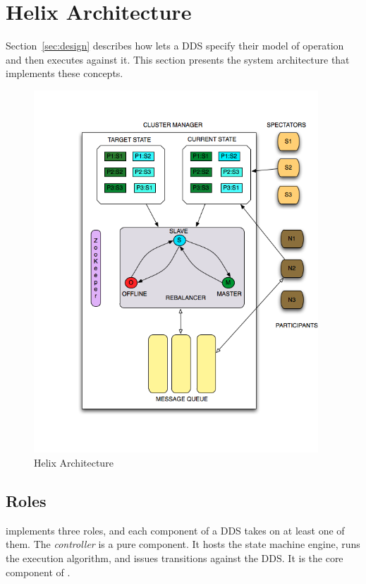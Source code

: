 \section{Helix Architecture}
\label{sec:arch}
%

Section~\ref{sec:design} describes how \helix lets a DDS specify their model of
operation and then executes against it.  This section presents the \helix system
architecture that implements these concepts.

\begin{figure}
\begin{minipage}[t]{0.48\textwidth}
\includegraphics[width=0.95\textwidth]{Helix.png}
\caption{Helix Architecture}
\label{fig:arch}
\end{minipage}
\end{figure}

\subsection{\helix Roles}
\label{sec:roles}
%
\helix implements three roles, and each component of a DDS takes on at least one of them.
The \emph{controller} is a pure \helix component.  It hosts the state machine engine, 
runs the execution algorithm, and issues transitions against the DDS.  It is the
core component of \helix.

